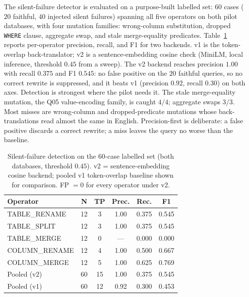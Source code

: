 \documentclass[conference,10pt,a4paper]{IEEEtran}
\begin{document}
The silent-failure detector is evaluated on a purpose-built labelled
set: $60$ cases ($20$ faithful, $40$ injected silent failures)
spanning all five operators on both pilot databases, with four
mutation families:
wrong-column substitution, dropped \texttt{WHERE} clause, aggregate
swap, and stale merge-equality predicates. Table~\ref{tab:sfd} reports
per-operator precision, recall, and F1 for two backends. v1 is the
token-overlap back-translator; v2 is a sentence-embedding cosine check
(MiniLM, local inference, threshold $0.45$ from a sweep). The v2
backend reaches precision $1.00$ with recall $0.375$ and F1 $0.545$:
no false positive on the $20$ faithful queries, so no correct rewrite
is suppressed, and it beats v1 (precision $0.92$, recall $0.30$) on
both axes. Detection is
strongest where the pilot needs it. The stale merge-equality mutation,
the Q05 value-encoding family, is caught $4/4$; aggregate swaps $3/3$.
Most misses are wrong-column and dropped-predicate mutations whose
back-translations read almost the same in English. Precision-first is deliberate: a false positive discards a correct
rewrite; a miss leaves the query no worse than the baseline.

\begin{table}[t]
\centering
\caption{Silent-failure detection on the 60-case labelled set
(both databases, threshold $0.45$). v2 = sentence-embedding cosine
backend; pooled v1 token-overlap baseline shown for comparison.
FP $= 0$ for every operator under v2.}
\label{tab:sfd}
\begin{tabular}{lccccc}
\toprule
\textbf{Operator} & \textbf{N} & \textbf{TP} & \textbf{Prec.} & \textbf{Rec.} & \textbf{F1} \\
\midrule
TABLE\_RENAME  & 12 & 3 & 1.00 & 0.375 & 0.545 \\
TABLE\_SPLIT   & 12 & 3 & 1.00 & 0.375 & 0.545 \\
TABLE\_MERGE   & 12 & 0 & ---  & 0.000 & 0.000 \\
COLUMN\_RENAME & 12 & 4 & 1.00 & 0.500 & 0.667 \\
COLUMN\_MERGE  & 12 & 5 & 1.00 & 0.625 & 0.769 \\
\midrule
Pooled (v2)    & 60 & 15 & 1.00 & 0.375 & 0.545 \\
Pooled (v1)    & 60 & 12 & 0.92 & 0.300 & 0.453 \\
\bottomrule
\end{tabular}
\end{table}
\end{document}

